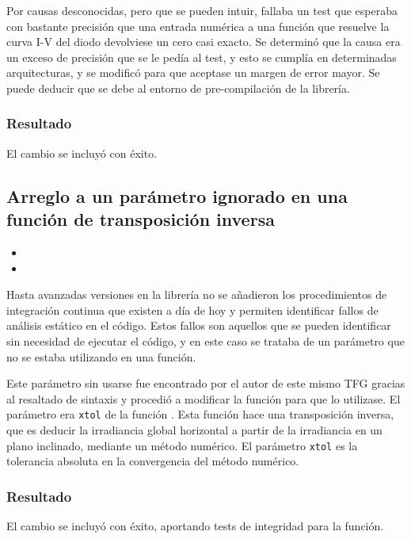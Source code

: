 Por causas desconocidas, pero que se pueden intuir, fallaba un test que esperaba con bastante precisión que una entrada numérica a una función que resuelve la curva I-V del diodo devolviese un cero casi exacto. Se determinó que la causa era un exceso de precisión que se le pedía al test, y esto se cumplía en determinadas arquitecturas, y se modificó para que aceptase un margen de error mayor. Se puede deducir que se debe al entorno de pre-compilación de la librería.

\subsubsection{Resultado}

El cambio se incluyó con éxito.

\subsection{Arreglo a un parámetro ignorado en una función de transposición inversa}

\begin{itemize}
    \item {}
    \item {}
\end{itemize}

Hasta avanzadas versiones en la librería no se añadieron los procedimientos de integración continua que existen a día de hoy y permiten identificar fallos de análisis estático en el código. Estos fallos son aquellos que se pueden identificar sin necesidad de ejecutar el código, y en este caso se trataba de un parámetro que no se estaba utilizando en una función.

Este parámetro sin usarse fue encontrado por el autor de este mismo TFG gracias al resaltado de sintaxis y procedió a modificar la función para que lo utilizase. El parámetro era \texttt{xtol} de la función . Esta función hace una transposición inversa, que es deducir la irradiancia global horizontal a partir de la irradiancia en un plano inclinado, mediante un método numérico. El parámetro \texttt{xtol} es la tolerancia absoluta en la convergencia del método numérico.

\subsubsection{Resultado}

El cambio se incluyó con éxito, aportando tests de integridad para la función.

